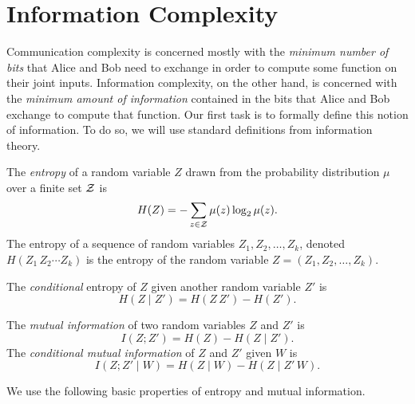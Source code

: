 \chapter[Information Complexity]{Information Complexity}

Communication complexity is concerned mostly with the \emph{minimum number of bits} that Alice and Bob need to exchange in order to compute some function on
their joint inputs. Information complexity, on the other hand, is concerned with
the \emph{minimum amount of information} contained in the bits that Alice and
Bob exchange to compute that function. Our first task is to formally define this notion of information. To do so, we will use standard definitions from information theory.

\begin{definition}[Entropy]
The \emph{entropy} of a random variable $Z$ drawn from the probability distribution $\mu$ over a finite set $\mathcal{Z}$ is
\[
H(Z) = - \sum_{z \in \mathcal{Z}} \mu(z) \log_2 \mu(z).
\]
The entropy of a sequence of random variables $Z_1,Z_2,\ldots,Z_k$, denoted $H(Z_1\,Z_2\cdots Z_k)$ is the entropy of the random variable $Z = (Z_1,Z_2,\ldots,Z_k)$.
\end{definition}

\begin{definition}
The \emph{conditional} entropy of $Z$ given another random variable $Z'$ is
\[
H(Z \mid Z') = H(Z\,Z') - H(Z').
\]
\end{definition}

\begin{definition}
The \emph{mutual information} of two random variables $Z$ and $Z'$ is
\[
I( Z ; Z' ) = H(Z) - H(Z \mid Z').
\]
The \emph{conditional mutual information} of $Z$ and $Z'$ given $W$ is
\[
I( Z ; Z' \mid W) = H(Z \mid W) - H(Z \mid Z'\, W).
\]
\end{definition}

We use the following basic properties of entropy and mutual information.

